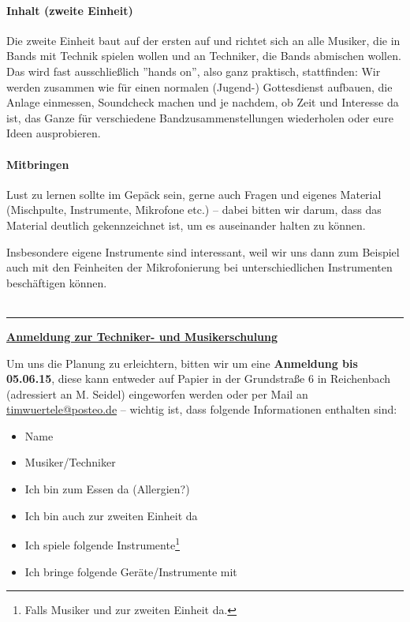 \documentclass[10pt,a4paper]{article}
\begin{document}
\setlength{\parskip}{-5pt}
\paragraph{Inhalt (zweite Einheit)} Die zweite Einheit baut auf der ersten auf und richtet sich an alle Musiker, die in Bands mit Technik spielen wollen und an Techniker, die Bands abmischen wollen. Das wird fast ausschließlich ''hands on'', also ganz praktisch, stattfinden: Wir werden zusammen wie für einen normalen (Jugend-) Gottesdienst aufbauen, die Anlage einmessen, Soundcheck machen und je nachdem, ob Zeit und Interesse da ist, das Ganze für verschiedene Bandzusammenstellungen wiederholen oder eure Ideen ausprobieren.

\paragraph{Mitbringen} Lust zu lernen sollte im Gepäck sein, gerne auch Fragen und eigenes Material (Mischpulte, Instrumente, Mikrofone etc.) -- dabei bitten wir darum, dass das Material deutlich gekennzeichnet ist, um es auseinander halten zu können.
\setlength{\parskip}{0pt}

Insbesondere eigene Instrumente sind interessant, weil wir uns dann zum Beispiel auch mit den Feinheiten der Mikrofonierung bei unterschiedlichen Instrumenten beschäftigen können.\\\\
\hrule\vspace{1em}
\begin{center}
\underline{\textbf{\Large Anmeldung zur Techniker- und Musikerschulung}}
\end{center}
Um uns die Planung zu erleichtern, bitten wir um eine \textbf{Anmeldung bis 05.06.15}, diese kann entweder auf Papier in der Grundstraße 6 in Reichenbach (adressiert an M. Seidel) eingeworfen werden oder per Mail an \href{mailto:timwuertele@posteo.de}{timwuertele@posteo.de} -- wichtig ist, dass folgende Informationen enthalten sind:\\
\renewcommand{\labelitemi}{ }
\begin{itemize}
    \setlength\itemsep{1em}
    \item Name \dotfill
    \item Musiker/Techniker \dotfill
    \item Ich bin zum Essen da (Allergien?) \dotfill
    \item Ich bin auch zur zweiten Einheit da \dotfill
    \item Ich spiele folgende Instrumente\footnote{Falls Musiker und zur zweiten Einheit da.} \dotfill
    \item Ich bringe folgende Geräte/Instrumente mit \dotfill
\end{itemize}
\end{document}
